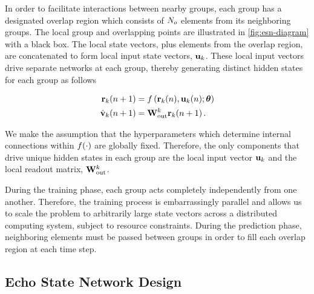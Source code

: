 In order to facilitate interactions between nearby groups, each group
has a designated overlap region which consists of $N_{o}$ elements
from its neighboring groups.
The local group and overlapping points are illustrated in \cref{fig:esn-diagram}
with a black box.
The local state vectors, plus elements from the overlap region, are concatenated
to form local input state vectors, $\mathbf{u}_{k}$.
These local input vectors drive separate networks at each group, thereby generating
distinct hidden states for each group as follows
\begin{linenomath*}\begin{equation}
    \begin{aligned}
        \mathbf{r}_{k}(n+1)
        &= f\left(
            \mathbf{r}_{k}(n), \mathbf{u}_{k}(n); \bm{\theta}
        \right) \\
        \hat{\mathbf{v}}_{k}(n+1)
        &= \mathbf{W}_\text{out}^{k} \mathbf{r}_{k}(n+1) \, .
    \end{aligned}
    \label{eq:local-rnn}
\end{equation}\end{linenomath*}
We make the assumption that the hyperparameters which determine internal
connections within $f(\cdot)$ are globally fixed.
Therefore, the only components
that drive unique hidden states in each group are the local input vector
$\mathbf{u}_{k}$ and the local readout matrix, $\mathbf{W}_\text{out}^{k}$.

During the training phase, each group acts completely independently from one
another.
Therefore, the training process is embarrassingly parallel and allows us to
scale the problem to arbitrarily large state vectors across a distributed
computing system, subject to resource constraints.
During the prediction phase, neighboring elements must be passed between
groups in order to fill each overlap region at each time step.


\subsection{Echo State Network Design}
\label{subsec:rc}


